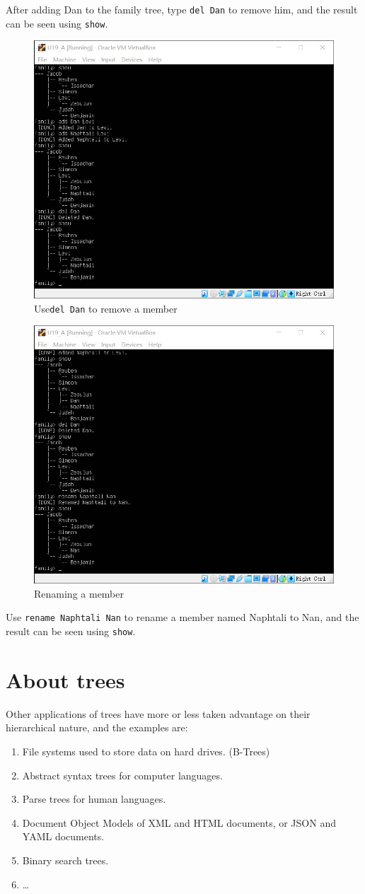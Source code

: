 \documentclass[cn,black,12pt,normal]{elegantnote}
\begin{document}
After adding Dan to the family tree, type \lstinline{del Dan} to remove him, and the result can be seen using \lstinline{show}.
\begin{figure}[H]
    \centering
    \includegraphics[width=0.7\linewidth]{image/f04.jpg}
    \caption{Use\lstinline{del Dan} to remove a member}
\end{figure}
\begin{figure}[H]
    \centering
    \includegraphics[width=0.7\linewidth]{image/f05.jpg}
    \caption{Renaming a member}
\end{figure}
Use \lstinline{rename Naphtali Nan} to rename a member named Naphtali to Nan, and the result can be seen using \lstinline{show}.


\section{About trees}

Other applications of trees have more or less taken advantage on their hierarchical nature, and the examples are:
\begin{enumerate}
    \item File systems used to store data on hard drives. (B-Trees)
    \item Abstract syntax trees for computer languages.
    \item Parse trees for human languages.
    \item Document Object Models of XML and HTML documents, or JSON and YAML documents.
    \item Binary search trees.
    \item \dots
\end{enumerate}
\end{document}
